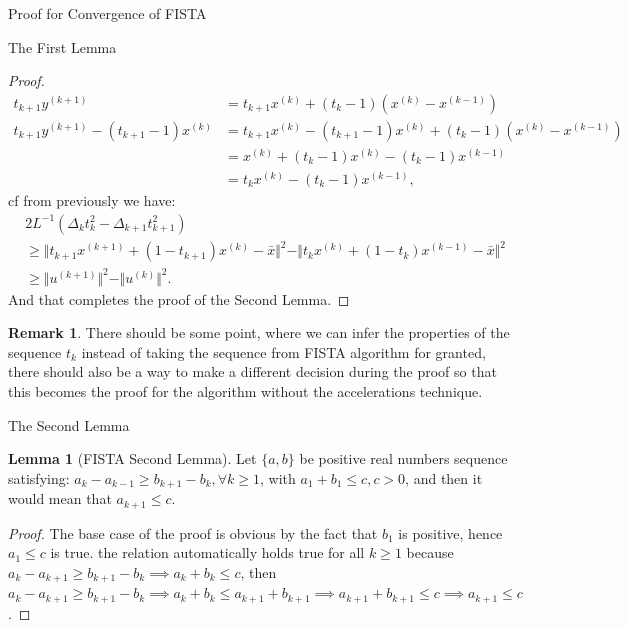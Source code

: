 \documentclass[]{article}
\theoremstyle{definition}
\newtheorem{lemma}{Lemma}[subsection]  %
\newtheorem{remark}{Remark}[subsection]
{
    \newtheorem{assumption}{Assumption}
}
\begin{document}
\begin{section}{Proof for Convergence of FISTA}
\begin{subsection}{The First Lemma}
\begin{proof}
\begin{align*}
                t_{k + 1}y^{(k + 1)} &= t_{k + 1}x^{(k)} + (t_k - 1)(x^{(k)} - x^{(k - 1)})
                \\
                t_{k + 1}y^{(k + 1)} - (t_{k + 1}- 1)x^{(k)}
                &= t_{k + 1}x^{(k)} - (t_{k + 1}- 1)x^{(k)} + (t_k - 1)(x^{(k)} - x^{(k - 1)})
                \\
                &= 
                x^{(k)} + (t_k - 1)x^{(k)} - (t_k - 1)x^{(k - 1)}
                \\
                &= t_kx^{(k)} - (t_k - 1)x^{(k - 1)}, 
            \end{align*}
            cf from previously we have: 
            \begin{align*}
                & 2L^{-1}(\Delta_k t_k^2 - \Delta_{k + 1}t_{k + 1}^2)
                \\
                &\ge 
                \Vert 
                    t_{k + 1}x^{(k + 1)}
                    + 
                    (1 - t_{k + 1}) x^{(k)} - \bar x
                \Vert^2
                - 
                \Vert t_kx^{(k)} + (1 - t_k)x^{(k -1)} - \bar x\Vert^2
                \\
                & \ge \Vert u^{(k + 1)}\Vert^2 - \Vert u^{(k)}\Vert^2.
            \end{align*}
            And that completes the proof of the Second Lemma. 
        \end{proof}
        \begin{remark}
            There should be some point, where we can infer the properties of the sequence $t_k$ instead of taking the sequence from FISTA algorithm for granted, there should also be a way to make a different decision during the proof so that this becomes the proof for the algorithm without the accelerations technique. 
        \end{remark}
    \end{subsection}

    \begin{subsection}{The Second Lemma}
        \begin{lemma}[FISTA Second Lemma]
            Let $\{a, b\}$ be positive real numbers sequence satisfying: $a_k - a_{k - 1}\ge b_{k + 1} - b_k, \forall k \ge 1$, with $a_1 + b_1 \le c, c > 0$, and then it would mean that $a_{k + 1}\le c$. 
        \end{lemma}
        \begin{proof}
            The base case of the proof is obvious by the fact that $b_1$ is positive, hence $a_1 \le c$ is true. the relation automatically holds true for all $k\ge 1$ because $a_k - a_{k + 1}\ge b_{k + 1} - b_k \implies a_k + b_k \le c$, then $a_k - a_{k + 1}\ge b_{k + 1} - b_k \implies a_k + b_k \le a_{k + 1} + b_{k + 1} \implies a_{k + 1} + b_{k + 1} \le c\implies a_{k + 1}\le c$. 
        \end{proof}
    \end{subsection}


\end{section}
\end{document}
